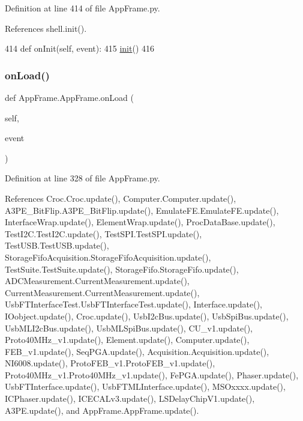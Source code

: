 Definition at line 414 of file App\+Frame.\+py.



References shell.\+init().


\begin{DoxyCode}
414     \textcolor{keyword}{def }onInit(self, event):
415         \hyperlink{namespaceshell_aa0929fa150d13168df6061f9d51b727b}{init}()
416 
\end{DoxyCode}
\mbox{\label{classAppFrame_1_1AppFrame_a3a44fde65be4ba4bd5a92f4e85a29772}} 
\subsubsection{\texorpdfstring{on\+Load()}{onLoad()}}
{\footnotesize\ttfamily def App\+Frame.\+App\+Frame.\+on\+Load (\begin{DoxyParamCaption}\item[{}]{self,  }\item[{}]{event }\end{DoxyParamCaption})}



Definition at line 328 of file App\+Frame.\+py.



References Croc.\+Croc.\+update(), Computer.\+Computer.\+update(), A3\+P\+E\+\_\+\+Bit\+Flip.\+A3\+P\+E\+\_\+\+Bit\+Flip.\+update(), Emulate\+F\+E.\+Emulate\+F\+E.\+update(), Interface\+Wrap.\+update(), Element\+Wrap.\+update(), Proc\+Data\+Base.\+update(), Test\+I2\+C.\+Test\+I2\+C.\+update(), Test\+S\+P\+I.\+Test\+S\+P\+I.\+update(), Test\+U\+S\+B.\+Test\+U\+S\+B.\+update(), Storage\+Fifo\+Acquisition.\+Storage\+Fifo\+Acquisition.\+update(), Test\+Suite.\+Test\+Suite.\+update(), Storage\+Fifo.\+Storage\+Fifo.\+update(), A\+D\+C\+Measurement.\+Current\+Measurement.\+update(), Current\+Measurement.\+Current\+Measurement.\+update(), Usb\+F\+T\+Interface\+Test.\+Usb\+F\+T\+Interface\+Test.\+update(), Interface.\+update(), I\+Oobject.\+update(), Croc.\+update(), Usb\+I2c\+Bus.\+update(), Usb\+Spi\+Bus.\+update(), Usb\+M\+L\+I2c\+Bus.\+update(), Usb\+M\+L\+Spi\+Bus.\+update(), C\+U\+\_\+v1.\+update(), Proto40\+M\+Hz\+\_\+v1.\+update(), Element.\+update(), Computer.\+update(), F\+E\+B\+\_\+v1.\+update(), Seq\+P\+G\+A.\+update(), Acquisition.\+Acquisition.\+update(), N\+I6008.\+update(), Proto\+F\+E\+B\+\_\+v1.\+Proto\+F\+E\+B\+\_\+v1.\+update(), Proto40\+M\+Hz\+\_\+v1.\+Proto40\+M\+Hz\+\_\+v1.\+update(), Fe\+P\+G\+A.\+update(), Phaser.\+update(), Usb\+F\+T\+Interface.\+update(), Usb\+F\+T\+M\+L\+Interface.\+update(), M\+S\+Oxxxx.\+update(), I\+C\+Phaser.\+update(), I\+C\+E\+C\+A\+Lv3.\+update(), L\+S\+Delay\+Chip\+V1.\+update(), A3\+P\+E.\+update(), and App\+Frame.\+App\+Frame.\+update().


